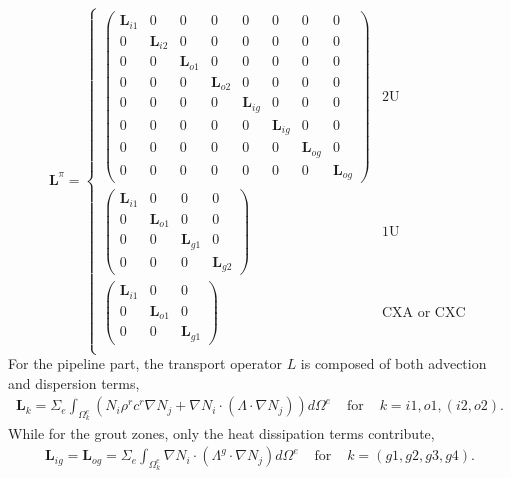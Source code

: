 \begin{equation}
\bm{L}^\pi = \left\{ \begin{array}{ll}
\left( \begin{array}{cccccccc}
\bm{L}_{i1} & 0 & 0 & 0 & 0 & 0 & 0 & 0 \\
0 & \bm{L}_{i2} & 0 & 0 & 0 & 0 & 0 & 0 \\
0 & 0 & \bm{L}_{o1} & 0 & 0 & 0 & 0 & 0 \\
0 & 0 & 0 & \bm{L}_{o2} & 0 & 0 & 0 & 0 \\
0 & 0 & 0 & 0 & \bm{L}_{ig} & 0 & 0 & 0 \\
0 & 0 & 0 & 0 & 0 & \bm{L}_{ig} & 0 & 0 \\
0 & 0 & 0 & 0 & 0 & 0 & \bm{L}_{og} & 0 \\
0 & 0 & 0 & 0 & 0 & 0 & 0 & \bm{L}_{og} \end{array} \right)
  & \mbox{2U} \\
\left( \begin{array}{cccc}
\bm{L}_{i1} & 0 & 0 & 0  \\
0 & \bm{L}_{o1} & 0 & 0  \\
0 & 0 & \bm{L}_{g1} & 0  \\
0 & 0 & 0 & \bm{L}_{g2}  \end{array} \right)
 & \mbox{1U} \\
\left( \begin{array}{ccc}
\bm{L}_{i1} & 0 & 0  \\
0 & \bm{L}_{o1} & 0  \\
0 & 0 & \bm{L}_{g1}  \end{array} \right)
 & \mbox{CXA or CXC} \\
       \end{array} \right.
\end{equation}
For the pipeline part, the transport operator $L$ is composed of both advection and dispersion terms, 
\begin{equation}
\begin{array}{lll}
\bm{L}_k = \Sigma_{e} \int_{\Omega_k^e} \left( N_i \rho^r c^r \nabla N_j 
+ \nabla N_i \cdot ( \Lambda \cdot \nabla N_j ) \right) d\Omega^e 
&\mbox{~for~}& k = i1, o1, (i2, o2). 
\end{array}
\end{equation}
While for the grout zones, only the heat dissipation terms contribute, 
\begin{equation}
\begin{array}{lll}
\bm{L}_{ig} = \bm{L}_{og} = \Sigma_{e} \int_{\Omega_k^e} \nabla N_i \cdot ( \Lambda^g \cdot \nabla N_j ) d\Omega^e 
&\mbox{~for~}& k = (g1, g2, g3, g4). 
\end{array}
\end{equation}
